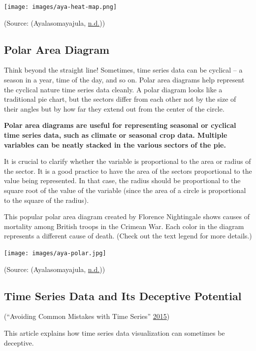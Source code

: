 \documentclass[]{book}
\begin{document}
\texttt{[image: images/aya-heat-map.png]}

(Source: (Ayalasomayajula, \protect\hyperlink{ref-aya-time-series}{n.d.}))

\hypertarget{polar-area-diagram}{%
\subsection{Polar Area Diagram}\label{polar-area-diagram}}

Think beyond the straight line! Sometimes, time series data can be cyclical -- a season in a year, time of the day, and so on. Polar area diagrams help represent the cyclical nature time series data cleanly. A polar diagram looks like a traditional pie chart, but the sectors differ from each other not by the size of their angles but by how far they extend out from the center of the circle.

\textbf{Polar area diagrams are useful for representing seasonal or cyclical time series data, such as climate or seasonal crop data. Multiple variables can be neatly stacked in the various sectors of the pie.}

It is crucial to clarify whether the variable is proportional to the area or radius of the sector. It is a good practice to have the area of the sectors proportional to the value being represented. In that case, the radius should be proportional to the square root of the value of the variable (since the area of a circle is proportional to the square of the radius).

This popular polar area diagram created by Florence Nightingale shows causes of mortality among British troops in the Crimean War. Each color in the diagram represents a different cause of death. (Check out the text legend for more details.)

\texttt{[image: images/aya-polar.jpg]}

(Source: (Ayalasomayajula, \protect\hyperlink{ref-aya-time-series}{n.d.}))

\hypertarget{time-series-data-and-its-deceptive-potential}{%
\subsection{Time Series Data and Its Deceptive Potential}\label{time-series-data-and-its-deceptive-potential}}

(``Avoiding Common Mistakes with Time Series'' \protect\hyperlink{ref-TimeSeries}{2015})

This article explains how time series data visualization can sometimes be deceptive.
\end{document}
